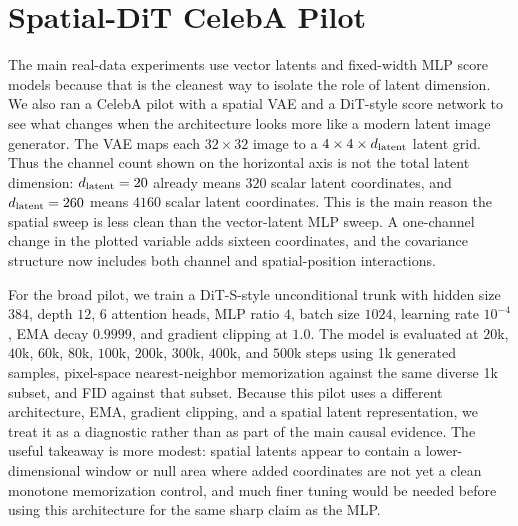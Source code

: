 \FloatBarrier

\section{Spatial-DiT CelebA Pilot}
\label{app:spatial-dit}

The main real-data experiments use vector latents and fixed-width MLP score
models because that is the cleanest way to isolate the role of latent
dimension. We also ran a CelebA pilot with a spatial VAE and a DiT-style score
network to see what changes when the architecture looks more like a modern
latent image generator. The VAE maps each $32\times32$ image to a
$4\times4\times d_{\mathrm{latent}}$ latent grid. Thus the channel count shown on the
horizontal axis is not the total latent dimension: $d_{\mathrm{latent}}=20$ already means
$320$ scalar latent coordinates, and $d_{\mathrm{latent}}=260$ means $4160$ scalar latent
coordinates. This is the main reason the spatial sweep is less clean than the
vector-latent MLP sweep. A one-channel change in the plotted variable adds
sixteen coordinates, and the covariance structure now includes both channel
and spatial-position interactions.

For the broad pilot, we train a DiT-S-style unconditional trunk with hidden
size $384$, depth $12$, $6$ attention heads, MLP ratio $4$, batch size $1024$,
learning rate $10^{-4}$, EMA decay $0.9999$, and gradient clipping at $1.0$.
The model is evaluated at $20$k, $40$k, $60$k, $80$k, $100$k, $200$k,
$300$k, $400$k, and $500$k steps using 1k generated samples, pixel-space
nearest-neighbor memorization against the same diverse 1k subset, and FID
against that subset. Because this pilot uses a different architecture, EMA,
gradient clipping, and a spatial latent representation, we treat it as a
diagnostic rather than as part of the main causal evidence. The useful
takeaway is more modest: spatial latents appear to contain a lower-dimensional
window or null area where added coordinates are not yet a clean monotone
memorization control, and much finer tuning would be needed before using this
architecture for the same sharp claim as the MLP.

